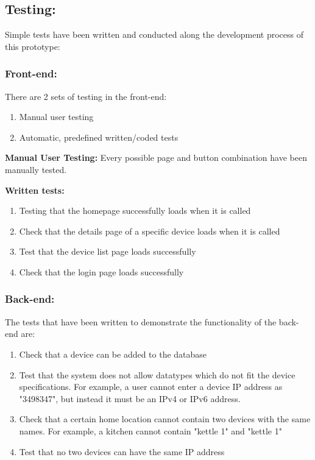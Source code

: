 \documentclass[10pt,twocolumn]{witseiepaper}
\begin{document}
	\subsection{Testing:}
	Simple tests have been written and conducted along the development process of this prototype: 
	
	\subsubsection{Front-end:}
	There are 2 sets of testing in the front-end: 
	\begin{enumerate}
		\item Manual user testing
		\item Automatic, predefined written/coded tests
	\end{enumerate}
	
	\textbf{Manual User Testing:}
	Every possible page and button combination have been manually tested. 
	
	\textbf{Written tests:}
	\begin{enumerate}
		\item Testing that the homepage successfully loads when it is called
		\item Check that the details page of a specific device loads when it is called
		\item Test that the device list page loads successfully
		\item Check that the login page loads successfully
	\end{enumerate}	
	
	\subsubsection{Back-end:}
	The tests that have been written to demonstrate the functionality of the back-end are: 
	\begin{enumerate}
		\item Check that a device can be added to the database
		\item Test that the system does not allow datatypes which do not fit the device specifications. For example, a user cannot enter a device IP address as "3498347", but instead it must be an IPv4 or IPv6 address. 
		\item Check that a certain home location cannot contain two devices with the same names. For example, a kitchen cannot contain "kettle 1" and "kettle 1" 
		\item Test that no two devices can have the same IP address
	\end{enumerate}
	
\end{document}
